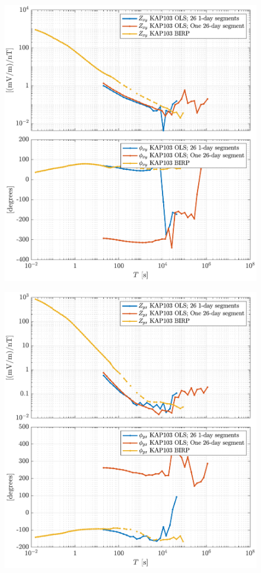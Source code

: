 \documentclass{article}
\begin{document}
\clearpage

\begin{figure}[h!]
\centering
\includegraphics[width=\textwidth]{figures/KAP103/transferfnZ_compare-Z_xy_Magnitude_Phase.pdf}
\caption{}
\label{fig:universe}
\end{figure}

\begin{figure}[h!]
\centering
\includegraphics[width=\textwidth]{figures/KAP103/transferfnZ_compare-Z_yx_Magnitude_Phase.pdf}
\caption{}
\label{fig:universe}
\end{figure}
\end{document}
